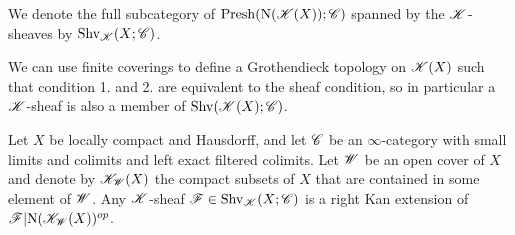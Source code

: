 \documentclass[../../thesis.tex]{subfiles}
\begin{document}
\begin{definition}
    We denote the full subcategory of $\mathrm{Presh}(\mathrm{N}(\mathscr{K}(X)); \mathscr{C})$ spanned by the $\mathscr{K}$-sheaves by $\mathrm{Shv}_{\mathscr{K}}(X;\mathscr{C})$.
\end{definition}
\begin{remark}
    We can use finite coverings to define a Grothendieck topology on $\mathscr{K}(X)$ such that condition 1. and 2. are equivalent to the sheaf condition, so in particular a $\mathscr{K}$-sheaf is also a member of $\mathrm{Shv}(\mathscr{K}(X); \mathscr{C})$.
\end{remark}
\begin{lemma}\label{7.3.4.8}
    Let $X$ be locally compact and Hausdorff, and let $\mathscr{C}$ be an $\infty$-category with small limits and colimits and left exact filtered colimits.
    Let $\mathscr{W}$ be an open cover of $X$ and denote by $\mathscr{K}_{\mathscr{W}}(X)$ the compact subsets of $X$ that are contained in some element of $\mathscr{W}$.
    Any $\mathscr{K}$-sheaf $\mathscr{F}\in \mathrm{Shv}_{\mathscr{K}}(X;\mathscr{C})$ is a right Kan extension of $\mathscr{F}|\mathrm{N}(\mathscr{K}_{\mathscr{W}}(X))^{op}$.
\end{lemma}
\end{document}
